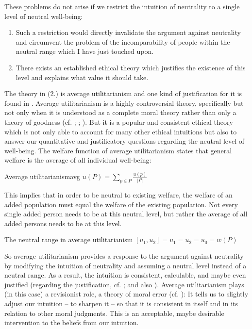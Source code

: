 These problems do not arise if we restrict the intuition of neutrality to a single level of neutral well-being: 
\begin{enumerate}
\item Such a restriction would directly invalidate the argument against neutrality and circumvent the problem of the incomparability of people within the neutral range which I have just touched upon. 
\item There exists an established ethical theory which justifies the existence of this level and explains what value it should take. 
\end{enumerate}
The theory in (2.) is average utilitarianism and one kind of justification for it is found in . Average utilitarianism is a highly controversial theory, specifically but not only when it is understood as a complete moral theory rather than only a theory of goodness (cf. ; ; ). But it is a popular and consistent ethical theory which is not only able to account for many other ethical intuitions but also to answer our quantitative and justificatory questions regarding the neutral level of well-being. The welfare function of average utilitarianism states that general welfare is the average of all individual well-being: 

\begin{Definition}{Average utilitarianism}{avg}
$u(P) = \sum_{p \in P} \frac{u(p)}{|P|}$
\end{Definition}

This implies that in order to be neutral to existing welfare, the welfare of an added population must equal the welfare of the existing population. Not every single added person needs to be at this neutral level, but rather the average of all added persons needs to be at this level. 

\begin{Definition}{The neutral range in average utilitarianism}{}
$[u_1, u_2] = u_1 = u_2 = u_0 = w(P)$
\end{Definition}

So average utilitarianism provides a response to the argument against neutrality by modifying the intuition of neutrality and assuming a neutral level instead of a neutral range. As a result, the intuition is consistent, calculable, and maybe even justified (regarding the justification, cf. ; and also ). Average utilitarianism plays (in this case) a revisionist role, a theory of moral error (cf. ): It tells us to slightly adjust our intuition -- to sharpen it -- so that it is consistent in itself and in its relation to other moral judgments. This is an acceptable, maybe desirable intervention to the beliefs from our intuition. 

